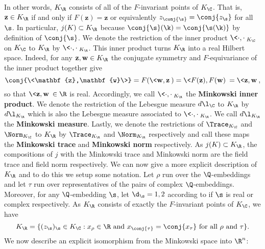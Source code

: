     In other words, $K_{\R}$ consists of all of the $F$-invariant points of $K_{\C}$. That is, $\mathbf{z} \in K_{\R}$ if and only if $F(\mathbf{z}) = \mathbf{z}$ or equivalently $z_{\conj{\s}} = \conj{z_{\s}}$ for all $\s$. In particular, $j(K) \subset K_{\R}$ because $\conj{\s}(\k) = \conj{\s(\k)}$ by definition of $\conj{\s}$. We denote the restriction of the inner product $\<\cdot,\cdot\>_{K_{\C}}$ on $K_{\C}$ to $K_{\R}$ by $\<\cdot,\cdot\>_{K_{\R}}$. This inner product turns $K_{\R}$ into a real Hilbert space. Indeed, for any $\mathbf{z},\mathbf{w} \in K_{\R}$ the conjugate symmetry and $F$-equivariance of the inner product together give
    \[
      \conj{\<\mathbf{z},\mathbf{w}\>} = F(\<\mathbf{w},\mathbf{z}\>) = \<F(\mathbf{z}),F(\mathbf{w})\> = \<\mathbf{z},\mathbf{w}\>,
    \]
    so that $\<\mathbf{z},\mathbf{w}\> \in \R$ is real. Accordingly, we call $\<\cdot,\cdot\>_{K_{\R}}$ the \textbf{Minkowski inner product}. We denote the restriction of the Lebesgue measure $d\l_{\C}$ to $K_{\R}$ by $d\l_{K_{\R}}$ which is also the Lebesgue measure associated to $\<\cdot,\cdot\>_{K_{\R}}$. We call $d\l_{K_{\R}}$ the \textbf{Minkowski measure}. Lastly, we denote the restrictions of $\Trace_{K_{\C}}$ and $\Norm_{K_{\C}}$ to $K_{\R}$ by $\Trace_{K_{\R}}$ and $\Norm_{K_{\R}}$ respectively and call these maps the \textbf{Minkowski trace} and \textbf{Minkowski norm} respectively. As $j(K) \subset K_{\R}$, the compositions of $j$ with the Minkowski trace and Minkowski norm are the field trace and field norm respectively. We can now give a more explicit description of $K_{\R}$ and to do this we setup some notation. Let $\rho$ run over the $\Q$-embeddings and let $\tau$ run over representatives of the pairs of complex $\Q$-embeddings. Moreover, for any $\Q$-embedding $\s$, let $\d_{\s} = 1,2$ according to if $\s$ is real or complex respectively. As $K_{\R}$ consists of exactly the $F$-invariant points of $K_{\C}$, we have
    \[
      K_{\R} = \{(z_{\s})_{\s} \in K_{\C}:\text{$x_{\rho} \in \R$ and $x_{\conj{\tau}} = \conj{x_{\tau}}$ for all $\rho$ and $\tau$}\}.
    \]
    We now describe an explicit isomorphism from the Minkowski space into $\R^{n}$:
    
